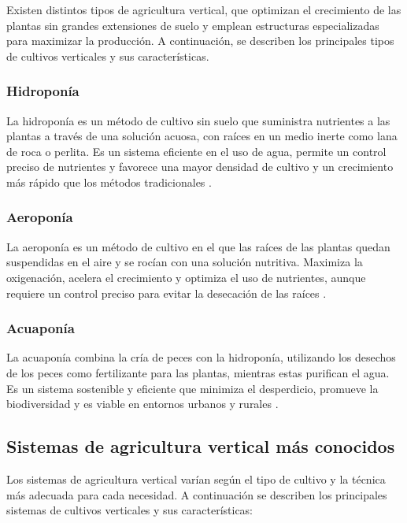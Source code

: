 
Existen distintos tipos de agricultura vertical, que optimizan el crecimiento de las plantas sin grandes extensiones de suelo y emplean estructuras especializadas para maximizar la producción.
A continuación, se describen los principales tipos de cultivos verticales y sus características.

\subsubsection{Hidroponía}
La hidroponía es un método de cultivo sin suelo que suministra nutrientes a las plantas a través de una solución acuosa, con raíces en un medio inerte como lana de roca o perlita. Es un sistema eficiente en el uso de agua, permite un control preciso de nutrientes y favorece una mayor densidad de cultivo y un crecimiento más rápido que los métodos tradicionales \cite{SANTANDER} \cite{CULTIVOS:TIPOS}.
\subsubsection{Aeroponía}
La aeroponía es un método de cultivo en el que las raíces de las plantas quedan suspendidas en el aire y se rocían con una solución nutritiva. Maximiza la oxigenación, acelera el crecimiento y optimiza el uso de nutrientes, aunque requiere un control preciso para evitar la desecación de las raíces \cite{SANTANDER} \cite{CULTIVOS:TIPOS}.
\subsubsection{Acuaponía}
La acuaponía combina la cría de peces con la hidroponía, utilizando los desechos de los peces como fertilizante para las plantas, mientras estas purifican el agua. Es un sistema sostenible y eficiente que minimiza el desperdicio, promueve la biodiversidad y es viable en entornos urbanos y rurales \cite{CULTIVOS:TIPOS}.


\subsection{Sistemas de agricultura vertical más conocidos}
Los sistemas de agricultura vertical varían según el tipo de cultivo y la técnica más adecuada para cada necesidad.
A continuación se describen los principales sistemas de cultivos verticales y sus características:

